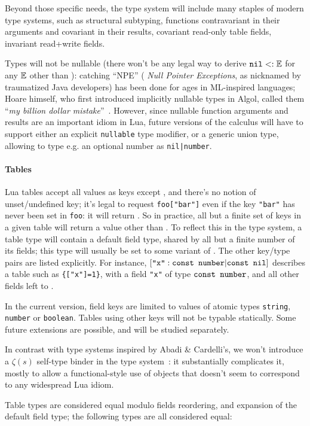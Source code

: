 Beyond those specific needs, the type system will include many staples
of modern type systems, such as structural subtyping, functions
contravariant in their arguments and covariant in their results,
covariant read-only table fields, invariant read+write fields.

Types will not be nullable (there won't be any legal way to derive
$\texttt{nil}<:\mathbb{E}$ for any $\mathbb{E}$ other than \Nil): catching ``NPE'' ({\em
  Null Pointer Exceptions}, as nicknamed by traumatized Java
developers) has been done for ages in ML-inspired languages; Hoare
himself, who first introduced implicitly nullable types in Algol,
called them ``{\em my billion dollar mistake}''~\cite{?}.  However,
since nullable function arguments and results are an important idiom
in Lua, future versions of the calculus will have to support either an
explicit \verb+nullable+ type modifier, or a generic union type, allowing
to type e.g. an optional number as \verb+nil|number+.

\paragraph{Tables}
Lua tables accept all values as keys except \Nil, and there's no
notion of unset/undefined key; it's legal to request {\tt foo["bar"]}
even if the key {\tt"bar"} has never been set in {\tt foo}: it will
return \Nil. So in practice, all but a finite set of keys in a given
table will return a value other than \Nil. To reflect this in the type
system, a table type will contain a default field type, shared by all
but a finite number of its fields; this type will usually be set to
some variant of \Nil. The other key/type pairs are listed explicitly.
For instance, $[\texttt{"x"}:\texttt{const }{\texttt{number}}|\texttt{const }\texttt{nil}]$ describes a table
such as \verb+{["x"]=1}+, with a field {\tt"x"} of type $\texttt{const }\texttt{number}$,
and all other fields left to \Nil.

In the current version, field keys are limited to values of atomic
types \verb+string+, \verb+number+ or \verb+boolean+. Tables using
other keys will not be typable statically. Some future extensions are
possible, and will be studied separately.

In contrast with type systems inspired by Abadi \& Cardelli's, we
won't introduce a $\zeta(s)$ self-type binder in the type
system~\cite{sigma}: it substantially complicates it, mostly to allow a
functional-style use of objects that doesn't seem to correspond to any
widespread Lua idiom.

Table types are considered equal modulo fields reordering, and
expansion of the default field type; the following types are all
considered equal:

